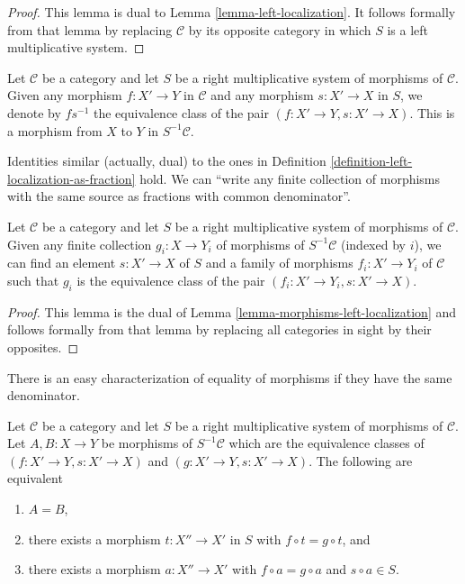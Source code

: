 \begin{proof}
This lemma is dual to
Lemma \ref{lemma-left-localization}.
It follows formally from that lemma by replacing
$\mathcal{C}$ by its opposite category in which
$S$ is a left multiplicative system.
\end{proof}

\begin{definition}
\label{definition-right-localization-as-fraction}
Let $\mathcal{C}$ be a category and let $S$ be a right multiplicative
system of morphisms of $\mathcal{C}$. Given any morphism
$f : X' \to Y$ in $\mathcal{C}$ and any morphism $s : X' \to X$ in
$S$, we denote by {\it $f s^{-1}$} the equivalence class of the pair
$(f : X' \to Y, s : X' \to X)$. This is a morphism from $X$ to $Y$
in $S^{-1} \mathcal{C}$.
\end{definition}

\noindent
Identities similar (actually, dual) to the ones in Definition
\ref{definition-left-localization-as-fraction} hold.
We can ``write any finite collection of morphisms with the same source
as fractions with common denominator''.

\begin{lemma}
\label{lemma-morphisms-right-localization}
Let $\mathcal{C}$ be a category and let $S$ be a right multiplicative
system of morphisms of $\mathcal{C}$. Given any finite collection
$g_i : X \to Y_i$ of morphisms of $S^{-1}\mathcal{C}$
(indexed by $i$),
we can find an element $s : X' \to X$ of $S$ and a family
of morphisms $f_i : X' \to Y_i$ of $\mathcal{C}$ such that
$g_i$ is the equivalence class of the pair
$(f_i : X' \to Y_i, s : X' \to X)$.
\end{lemma}

\begin{proof}
This lemma is the dual of
Lemma \ref{lemma-morphisms-left-localization}
and follows formally from that lemma by replacing all
categories in sight by their opposites.
\end{proof}

\noindent
There is an easy characterization of equality of morphisms if they
have the same denominator.

\begin{lemma}
\label{lemma-equality-morphisms-right-localization}
Let $\mathcal{C}$ be a category and let $S$ be a right multiplicative
system of morphisms of $\mathcal{C}$. Let $A, B : X \to Y$ be
morphisms of $S^{-1}\mathcal{C}$ which are the equivalence
classes of $(f : X' \to Y, s : X' \to X)$ and
$(g : X' \to Y, s : X' \to X)$. The following are equivalent
\begin{enumerate}
\item $A = B$,
\item there exists a morphism $t : X'' \to X'$ in $S$ with
$f \circ t = g \circ t$, and
\item there exists a morphism $a : X'' \to X'$ with
$f \circ a = g \circ a$ and $s \circ a \in S$.
\end{enumerate}
\end{lemma}

